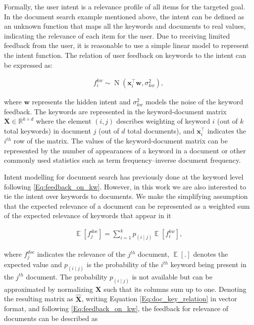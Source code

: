 \documentclass[dissertation,math,vertlayout,pdfa,colorlinks]{aaltoseries}
\newcommand{\bw}{\bm{w}}
\DeclareMathOperator{\normalpdf}{N}
\DeclareMathOperator{\E}{\mathbb{E}}
\newcommand{\tp}{^{\top}}
\begin{document}
Formally, the user intent is a relevance profile of all items for the targeted goal. In the document search example mentioned above, the intent can be defined as an unknown function that maps all the keywords %
and documents to real values, indicating the relevance of each item for the user. Due to receiving limited feedback from the user, it is reasonable to use a simple linear model to represent the intent function. The relation of user feedback on keywords to the intent can be expressed as:

\begin{align}\label{Eq:feedback_on_kw} 
f_{i}^{kw} \sim \normalpdf(\bm{x}_i\tp \bw, \sigma_{kw}^2), 
\end{align}

\noindent where $\bw$ represents the hidden intent and $\sigma_{kw}^2$ models the noise of the keyword feedback. The keywords are represented in the keyword-document matrix $\bm{X} \in \mathbb{R}^{k \times d}$ where the element $(i,j)$ describes weighting of keyword $i$ (out of $k$ total keywords) in document $j$ (out of $d$ total documents), and $\bm{x}_i\tp$ indicates the $i^{th}$ row of the matrix. The values of the keyword-document matrix can be represented by the number of appearances of a keyword in a document or other commonly used statistics such as term frequency–inverse document frequency. 

Intent modelling for document search has previously done at the keyword level \cite{Ruotsalo2018} following \ref{Eq:feedback_on_kw}. However, in this work we are also interested to tie the intent over keywords to documents. We make the simplifying assumption that the expected relevance of a document can be represented as a weighted sum of the expected relevance of keywords that appear in it

\begin{align}\label{Eq:doc_key_relation} 
 \E[f_{j}^{doc}] = \sum_{i=1}^{k} p_{(i \mid j)}  \E[f_{i}^{kw}],
\end{align}

\noindent where $f_{j}^{doc}$ indicates the relevance of the $j^{th}$ document, $\E[.]$ denotes the expected value and $p_{(i \mid j)}$ is the probability of the $i^{th}$ keyword being present in the $j^{th}$ document. The probability $p_{(i \mid j)}$ is not available but can be approximated by normalizing $\bm{X}$ such that its columns sum up to one. Denoting the resulting matrix as $\hat{\bm{X}}$, writing Equation \ref{Eq:doc_key_relation} in vector format, and following  \ref{Eq:feedback_on_kw}, the feedback for relevance of documents can be described as 
\end{document}
